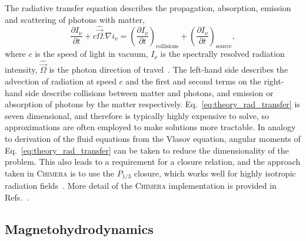 The radiative transfer equation describes the propagation, absorption, emission and scattering of photons with matter,
\begin{equation}
    \label{eq:theory_rad_transfer}
    \frac{\partial I_\nu}{\partial t} + c \hat{\vec{\Omega}}.\nabla i_\nu = \left ( \frac{\partial I_\nu}{\partial t} \right )_{\text{collisions}} + \left ( \frac{\partial I_\nu}{\partial t} \right )_{\text{source}},
\end{equation}
where $c$ is the speed of light in vacuum, $I_\nu$ is the spectrally resolved radiation intensity, $\hat{\vec{\Omega}}$ is the photon direction of travel~\cite{castor_radiation_2004}.
The left-hand side describes the advection of radiation at speed $c$ and the first and second terms on the right-hand side describe collisions between matter and photons, and emission or absorption of photons by the matter respectively.
Eq.~\ref{eq:theory_rad_transfer} is seven dimensional, and therefore is typically highly expensive to solve, so approximations are often employed to make solutions more tractable.
In analogy to derivation of the fluid equations from the Vlasov equation, angular moments of Eq.~\ref{eq:theory_rad_transfer} can be taken to reduce the dimensionality of the problem.
This also leads to a requirement for a closure relation, and the approach taken in \textsc{Chimera} is to use the $P_{1/3}$ closure, which works well for highly isotropic radiation fields~\cite{morel_diffusionlimit_2000}.
More detail of the \textsc{Chimera} implementation is provided in Refs.~\cite{jennings_radiation_2005,mcglinchey_radiationhydrodynamics_2017}.

\subsection{Magnetohydrodynamics}%
\label{sec:theory_MHD}

